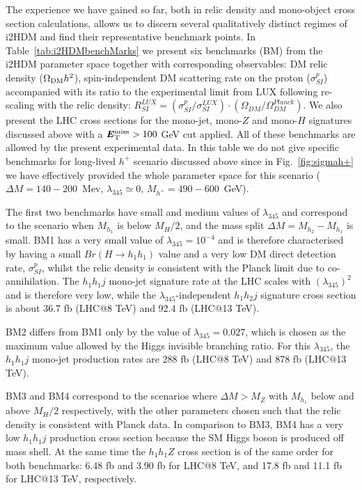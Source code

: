 \documentclass[12pt,a4paper]{article}
\newcommand {\red} {\color{red}}
\newcommand{\MET}{\textbf{\textit{E}$_{\rm T}^{\rm miss}$}}
\begin{document}

The experience we have gained so far, both in relic density and mono-object cross section calculations,
allows us to discern several qualitatively distinct regimes
of i2HDM and find their representative benchmark points.
In Table~\ref{tab:i2HDMbenchMarks} we present six benchmarks (BM) from the i2HDM  parameter space
together with corresponding observables: DM relic density ($\Omega_{\rm DM} h^2$),
 spin-independent  DM scattering rate on the proton ($\sigma_{SI}^p$)
accompanied with its ratio to the experimental limit from LUX following re-scaling with the relic density: 
$R_{SI}^{LUX} =(\sigma_{SI}^p/\sigma_{SI}^{LUX})\cdot (\Omega_{DM}/\Omega_{DM}^{Planck})$.
We also present the LHC cross sections for the mono-jet, mono-$Z$ and mono-$H$ signatures
discussed above with a $\MET > 100$ GeV cut applied.
All of these benchmarks are allowed by the present experimental data.
{
In this table we do not give specific benchmarks 
for long-lived $h^+$ scenario discussed above since in Fig.~\ref{fig:sigmah+}
we have effectively provided the whole parameter space for this scenario
($\Delta M = 140-200$~Mev, $\lambda_{345}\simeq 0$, $M_{h^+}=490-600$~GeV).
}

The first two benchmarks have small and medium values of $\lambda_{345}$ and correspond to the 
scenario when $M_{h_1}$ is below $M_H/2$, and the mass split $\Delta M = M_{h_2}-M_{h_1}$ is small.
BM1 has a very small value of  $\lambda_{345}=10^{-4}$ and is therefore characterised 
by having a small $Br(H\to h_1 h_1)$ value and a very low DM direct detection rate, $\sigma^p_{SI}$,
whilst the relic density is consistent with the Planck limit {due to co-annihilation}.
The $h_1h_1j$ mono-jet signature rate at the LHC scales with $(\lambda_{345})^2$ and is therefore very low,
while the $\lambda_{345}$-independent $h_1h_2j$ signature cross section 
is about 36.7 fb (LHC@8 TeV) and 92.4 fb (LHC@13 TeV).

BM2 differs from BM1 only by the value of $\lambda_{345}=0.027$, which is chosen as the maximum value 
allowed by the Higgs invisible branching ratio. For this $\lambda_{345}$,
the $h_1 h_1 j$ mono-jet production rates are 288 fb (LHC@8 TeV) and 878 fb (LHC@13 TeV).

BM3 and BM4 correspond to the scenarios where $\Delta M > M_Z$
with $M_{h_1}$ below and above $M_H/2$ respectively,
{with the other parameters chosen such that the} relic density is consistent with Planck data.
In comparison to BM3, BM4 has a very low $h_1h_1j$ production cross section because
the SM Higgs boson is produced off mass shell.
At the same time the $h_1 h_1 Z$ cross section 
is of the same order for both benchmarks: 6.48 fb and 3.90 fb for LHC@8 TeV,
and 17.8 fb and 11.1 fb for LHC@13 TeV, respectively.
\end{document}
